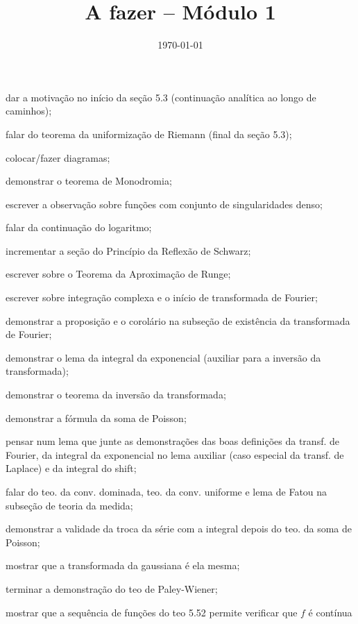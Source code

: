 \documentclass[12pt,a4paper]{article}
\title{A fazer -- Módulo 1}
\author{}
\date{\today}
\newcommand{\cmark}{\ding{51}}%
\newcommand{\done}{\rlap{$\square$}{\raisebox{2pt}{\large\hspace{1pt}\cmark}}%
\hspace{-2.5pt}}
\begin{document}
\maketitle

\begin{todolist}
    \item dar a motivação no início da seção 5.3 (continuação analítica ao longo
    de caminhos);
    \item falar do teorema da uniformização de Riemann (final da seção 5.3); 
    \item colocar/fazer diagramas;
    \item[\done] demonstrar o teorema de Monodromia;
    \item[\done] escrever a observação sobre funções com conjunto de singularidades denso;
    \item[\done] falar da continuação do logaritmo;
    \item[\done] incrementar a seção do Princípio da Reflexão de Schwarz;
    \item[\done] escrever sobre o Teorema da Aproximação de Runge;
    \item[\done] escrever sobre integração complexa e o início de transformada de Fourier;
    \item[\done] demonstrar a proposição e o corolário na subseção de existência da transformada de Fourier;
    \item[\done] demonstrar o lema da integral da exponencial (auxiliar para a inversão da transformada);
    \item[\done] demonstrar o teorema da inversão da transformada;
    \item[\done] demonstrar a fórmula da soma de Poisson;
    \item pensar num lema que junte as demonstrações das boas definições da transf. de Fourier,
          da integral da exponencial no lema auxiliar (caso especial da transf. de Laplace) e
          da integral do shift;
    \item falar do teo. da conv. dominada, teo. da conv. uniforme e lema de
    Fatou na subseção de teoria da medida;
    \item[\done] demonstrar a validade da troca da série com a integral depois do teo. da soma de Poisson;
    \item[\done] mostrar que a transformada da gaussiana é ela mesma;
    \item[\done] terminar a demonstração do teo de Paley-Wiener;
    \item[\done] mostrar que a sequência de funções do teo 5.52 
    permite verificar que $f$ é contínua

\end{todolist}
\end{document}
